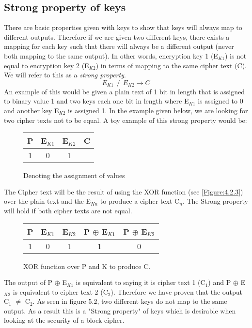 \documentclass[11pt,a4paper]{report}
\begin{document}
\subsection{Strong property of keys}
There are basic properties given with keys to show that keys will always map to different outputs. Therefore if we are given two different keys, there exists a mapping for each key such that there will always be a different output (never both mapping to the same output). In other words, encryption key 1 (E$_{K1}$) is not equal to encryption key 2 (E$_{K2}$) in terms of mapping to the same cipher text (C). We will refer to this as a \emph{strong property}.  
\begin{displaymath}
E_{K1} \neq E_{K2} \rightarrow C
\end{displaymath}
An example of this would be given a plain text of 1 bit in length that is assigned to binary value 1 and two keys each one bit in length where E$_{K1}$ is assigned to 0 and another key E$_{K2}$ is assigned 1. In the example given below, we are looking for two cipher texts not to be equal.
A toy example of this strong property would be:

\begin{figure}[H]
\centering
\label{tab:assignment of values}
\begin{tabular}{|c|c|c|c|}
\hline
P & E$_{K1}$ & E$_{K2}$ & C \\ \hline
1 & 0 & 1 & {}\\
\hline
\end{tabular}
\caption{Denoting the assignment of values}
\end{figure}
The Cipher text will be the result of using the XOR function (see \ref{Figure:4.2.3}) over the plain text and the E$_{Kn}$ to produce a cipher text C$_n$. The Strong property will hold if both cipher texts are not equal.

\begin{figure}[H]
\centering
\label{tab:XOR function}
\begin{tabular}{|c|c|c|c|c|}
\hline
P & E$_{K1}$ & E$_{K2}$ & P $\oplus$ E$_{K1}$ & P $\oplus$ E$_{K2}$\\ \hline
1 & 0 & 1 & 1 & 0 \\
\hline
\end{tabular}
\caption{XOR function over P and K to produce C.}
\end{figure}

The output of P $\oplus$ E$_{K1}$ is equivalent to saying it is cipher text 1 (C$_1$) and P $\oplus$ E$_{K2}$ is equivalent to cipher text 2 (C$_2$). Therefore we have proven that the output C$_1$ $\neq$ C$_2$.
 As seen in figure 5.2, two different keys do not map to the same output. As a result this is a "Strong property" of keys which is desirable when looking at the security of a block cipher.
\end{document}
